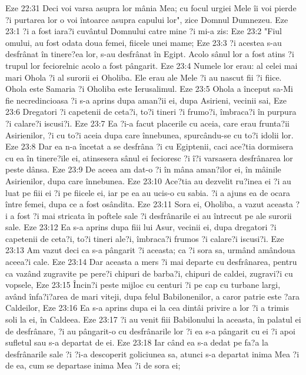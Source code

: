 Eze 22:31  Deci voi varsa asupra lor mânia Mea; cu focul urgiei Mele îi voi pierde ?i purtarea lor o voi întoarce asupra capului lor", zice Domnul Dumnezeu.
Eze 23:1  ?i a fost iara?i cuvântul Domnului catre mine ?i mi-a zis:
Eze 23:2  "Fiul omului, au fost odata doua femei, fiicele unei mame;
Eze 23:3  ?i acestea s-au desfrânat în tinere?ea lor, s-au desfrânat în Egipt. Acolo sânul lor a fost atins ?i trupul lor feciorelnic acolo a fost pângarit.
Eze 23:4  Numele lor erau: al celei mai mari Ohola ?i al surorii ei Oholiba. Ele erau ale Mele ?i au nascut fii ?i fiice. Ohola este Samaria ?i Oholiba este Ierusalimul.
Eze 23:5  Ohola a început sa-Mi fie necredincioasa ?i s-a aprins dupa aman?ii ei, dupa Asirieni, vecinii sai,
Eze 23:6  Dregatori ?i capetenii de ceta?i, to?i tineri ?i frumo?i, îmbraca?i în purpura ?i calare?i iscusi?i.
Eze 23:7  Ea ?i-a facut placerile cu aceia, care erau frunta?ii Asirienilor, ?i cu to?i aceia dupa care înnebunea, spurcându-se cu to?i idolii lor.
Eze 23:8  Dar ea n-a încetat a se desfrâna ?i cu Egiptenii, caci ace?tia dormisera cu ea în tinere?ile ei, atinsesera sânul ei fecioresc ?i î?i varsasera desfrânarea lor peste dânsa.
Eze 23:9  De aceea am dat-o ?i în mâna aman?ilor ei, în mâinile Asirienilor, dupa care înnebunea.
Eze 23:10  Ace?tia au dezvelit ru?inea ei ?i au luat pe fiii ei ?i pe fiicele ei, iar pe ea au ucis-o cu sabia. ?i a ajuns ea de ocara între femei, dupa ce a fost osândita.
Eze 23:11  Sora ei, Oholiba, a vazut aceasta ?i a fost ?i mai stricata în poftele sale ?i desfrânarile ei au întrecut pe ale surorii sale.
Eze 23:12  Ea s-a aprins dupa fiii lui Asur, vecinii ei, dupa dregatori ?i capetenii de ceta?i, to?i tineri ale?i, îmbraca?i frumos ?i calare?i iscusi?i.
Eze 23:13  Am vazut deci ca s-a pângarit ?i aceasta; ca ?i sora sa, urmând amândoua aceea?i cale.
Eze 23:14  Dar aceasta a mers ?i mai departe cu desfrânarea, pentru ca vazând zugravite pe pere?i chipuri de barba?i, chipuri de caldei, zugravi?i cu vopsele,
Eze 23:15  Încin?i peste mijloc cu centuri ?i pe cap cu turbane largi, având înfa?i?area de mari viteji, dupa felul Babilonenilor, a caror patrie este ?ara Caldeilor,
Eze 23:16  Ea s-a aprins dupa ei la cea dintâi privire a lor ?i a trimis soli la ei, în Caldeea.
Eze 23:17  ?i au venit fiii Babilonului la aceasta, în palatul ei de desfrânare, ?i au pângarit-o cu desfrânarile lor ?i ea s-a pângarit cu ei ?i apoi sufletul sau s-a departat de ei.
Eze 23:18  Iar când ea s-a dedat pe fa?a la desfrânarile sale ?i ?i-a descoperit goliciunea sa, atunci s-a departat inima Mea ?i de ea, cum se departase inima Mea ?i de sora ei;
